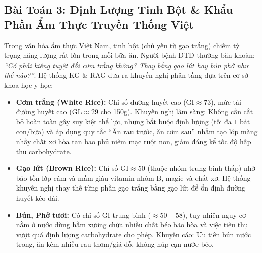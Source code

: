 \documentclass[12pt,a4paper]{report}
\begin{document}
\subsection{Bài Toán 3: Định Lượng Tinh Bột \& Khẩu Phần Ẩm Thực Truyền Thống Việt}
Trong văn hóa ẩm thực Việt Nam, tinh bột (chủ yếu từ gạo trắng) chiếm tỷ trọng năng lượng rất lớn trong mỗi bữa ăn. Người bệnh ĐTĐ thường băn khoăn: \textit{“Có phải kiêng tuyệt đối cơm trắng không? Thay bằng gạo lứt hay bún phở như thế nào?”}. Hệ thống KG \& RAG đưa ra khuyến nghị phân tầng dựa trên cơ sở khoa học y học:
\begin{itemize}[itemsep=1pt, parsep=0pt, topsep=2pt]
    \item \textbf{Cơm trắng (White Rice):} Chỉ số đường huyết cao ($\text{GI} \approx 73$), mức tải đường huyết cao ($\text{GL} \approx 29$ cho 150g). Khuyến nghị lâm sàng: Không cần cắt bỏ hoàn toàn gây suy kiệt thể lực, nhưng bắt buộc định lượng (tối đa $1$ bát con/bữa) và áp dụng quy tắc “Ăn rau trước, ăn cơm sau” nhằm tạo lớp màng nhầy chất xơ hòa tan bao phủ niêm mạc ruột non, giảm đáng kể tốc độ hấp thu carbohydrate.
    \item \textbf{Gạo lứt (Brown Rice):} Chỉ số $\text{GI} \approx 50$ (thuộc nhóm trung bình thấp) nhờ bảo tồn lớp cám và mầm giàu vitamin nhóm B, magie và chất xơ. Hệ thống khuyến nghị thay thế từng phần gạo trắng bằng gạo lứt để ổn định đường huyết kéo dài.
    \item \textbf{Bún, Phở tươi:} Có chỉ số GI trung bình ($\approx 50 - 58$), tuy nhiên nguy cơ nằm ở nước dùng hầm xương chứa nhiều chất béo bão hòa và việc tiêu thụ vượt quá định lượng carbohydrate cho phép. Khuyến cáo: Ưu tiên bún nước trong, ăn kèm nhiều rau thơm/giá đỗ, không húp cạn nước béo.
\end{itemize}
\end{document}

